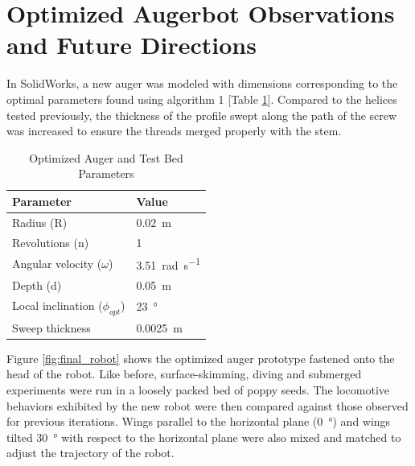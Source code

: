 \documentclass[letterpaper, 11 pt]{article}
\begin{document}
\section{Optimized Augerbot Observations and Future Directions}
In SolidWorks, a new auger was modeled with dimensions corresponding to the optimal parameters found using algorithm 1 [Table \ref{optParamTable}]. Compared to the helices tested previously, the thickness of the profile swept along the path of the screw was increased to ensure the threads merged properly with the stem.   

\begin{table}[H] 
\centering
\caption{Optimized Auger and Test Bed Parameters}
	\begin{tabular}{l | l}
	\textbf{Parameter} & \textbf{Value} \\
	\hline
	Radius (R) & \SI{0.02}{\m} \\
	Revolutions (n) & 1 \\
	Angular velocity ($\omega$) & \SI{3.51}{\radian\per\s} \\
	Depth (d) & \SI{0.05}{\m}\\  
	Local inclination ($\phi_{opt}$) & \SI{23}{\degree}\\
	Sweep thickness & \SI{0.0025}{\m}
	\end{tabular}
	\label{optParamTable}
\end{table}

\medskip
Figure \ref{fig:final_robot} shows the optimized auger prototype fastened onto the head of the robot. Like before, surface-skimming, diving and submerged experiments were run in a loosely packed bed of poppy seeds. The locomotive behaviors exhibited by the new robot were then compared against those observed for previous iterations. Wings parallel to the horizontal plane (\SI{0}{\degree}) and wings tilted \SI{30}{\degree} with respect to the horizontal plane were also mixed and matched to adjust the trajectory of the robot.  
\end{document}

